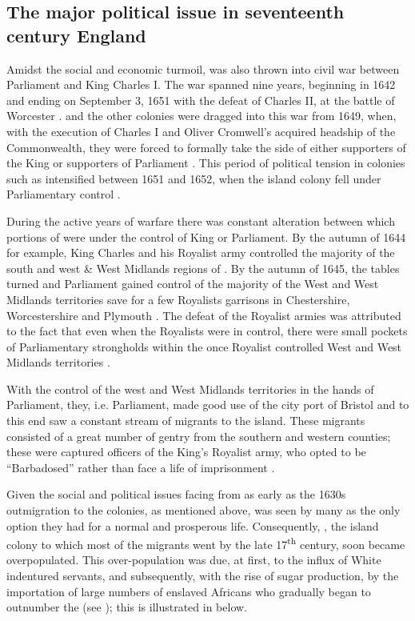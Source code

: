 \subsection{The major political issue in seventeenth century England}\label{6.1.2}
Amidst the social and economic turmoil,  was also thrown into civil war between Parliament and King Charles I. The war spanned nine years, beginning in 1642 and ending on September 3, 1651 with the defeat of Charles II, at the battle of Worcester \citep{Young73}.  and the other  colonies were dragged into this war from 1649, when, with the execution of Charles I and Oliver Cromwell's acquired headship of the Commonwealth, they were forced to formally take the side of either supporters of the King or supporters of Parliament \citep{Ligon73}. This period of political tension in colonies such as  intensified between 1651 and 1652, when the island colony fell under Parliamentary control \citep{Ligon73, Fraser90}.

During the active years of warfare there was constant alteration between which portions of  were under the control of King or Parliament. By the autumn of 1644 for example, King Charles and his Royalist army controlled the majority of the south and west \& West Midlands regions of . By the autumn of 1645, the tables turned and Parliament gained control of the majority of the West and West Midlands territories save for a few Royalists garrisons in Chestershire, Worcestershire and Plymouth \citep{Gaunt03}. The defeat of the Royalist armies was attributed to the fact that even when the Royalists were in control, there were small pockets of Parliamentary strongholds within the once Royalist controlled West and West Midlands territories \citep{Gaunt03}.

With the control of the west and West Midlands territories in the hands of Parliament, they, i.e. Parliament, made good use of the city port of Bristol and to this end  saw a constant stream of  migrants to the island. These migrants consisted of a great number of gentry from the southern and western counties; these were captured officers of the King's Royalist army, who opted to be {``Barbadosed''} rather than face a life of imprisonment \citep{Harlow26, Pugh57, Wheeler02, Manning06}.

Given the social and political issues facing  from as early as the 1630s outmigration to the  colonies, as mentioned above, was seen by many as the only option they had for a normal and prosperous life. Consequently, , the island colony to which most of the migrants went by the late 17\textsuperscript{th} century, soon became overpopulated. This over-population was due, at first, to the influx of White indentured servants, and subsequently, with the rise of sugar production, by the importation of large numbers of enslaved Africans \citep{James98} who gradually began to outnumber the  (see \citealt{Campbell77, Campbell84, Campbell93,  McCusker91, Galenson02}); this is illustrated in  below.

